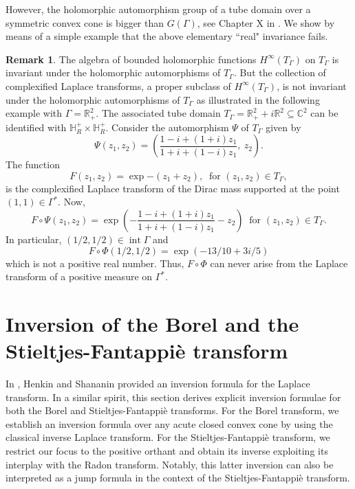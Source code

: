 \documentclass[11pt,reqno]{amsart}
\theoremstyle{plain}
\theoremstyle{definition}
\newtheorem{remark}[theorem]{Remark}
\numberwithin{equation}{section}
\begin{document}
However, the holomorphic automorphism group of a tube domain over a symmetric convex cone is bigger than $G(\Gamma)$, see Chapter X in \cite{Faraut-Koranyi}. We show by means of a simple example that the above  elementary ``real" invariance fails.

\begin{remark}
    The algebra of bounded holomorphic functions $H^\infty(T_\Gamma)$ on $T_\Gamma$ is invariant under the holomorphic automorphisms of $T_\Gamma$. But the collection of complexified Laplace transforms, a proper subclass of $H^\infty(T_\Gamma)$, is not invariant under the holomorphic automorphisms of $T_\Gamma$ as illustrated in the following example with $\Gamma = \mathbb{R}^2_+$. The associated tube domain $T_\Gamma = \mathbb{R}^2_+ + i \mathbb{R}^2 \subseteq \mathbb{C}^2$ can be identified with $\mathbb{H}_R^+ \times \mathbb{H}_R^+$. Consider the automorphism $\Psi$ of $T_\Gamma$ given by
	$$
	\Psi(z_1, z_2) = \left(\frac{1-i + (1+i)z_1}{1+i + (1-i)z_1}, \ z_2 \right).
	$$
	The function
	$$
	F(z_1, z_2) = \exp{-(z_1 + z_2)}, \ \text{ for } (z_1, z_2) \in T_\Gamma,
	$$
	is the complexified Laplace transform of the Dirac mass supported at the point $(1, 1) \in \Gamma^*$.
	Now,
	$$
	F\circ \Psi (z_1, z_2) = \exp{ \left(-\frac{1-i + (1+i)z_1}{1+i + (1-i)z_1} - z_2 \right)} \ \text{ for }(z_1, z_2) \in T_\Gamma.
	$$
	In particular, $(1/2, 1/2) \in \operatorname{int}\Gamma$ and
	$$
	F \circ \Phi(1/2, 1/2) = \exp(-13/10 +  3i/5 )
	$$
	which is not a positive real number. Thus, $F \circ \Phi$ can never arise from the Laplace transform of a positive measure on $\Gamma^*$.
\end{remark}


	\section{Inversion of the Borel and the Stieltjes-Fantappi\`e transform}\label{sec:inversion}
   In \cite[Proposition~4.1]{HS}, Henkin and Shananin provided an inversion formula for the Laplace transform. In a similar spirit, this section derives explicit inversion formulae for both the Borel and Stieltjes-Fantappi\`e transforms. For the Borel transform, we establish an inversion formula over any acute closed convex cone by using the classical inverse Laplace transform. For the Stieltjes-Fantappi\`e transform, we restrict our focus to the positive orthant and obtain its inverse exploiting its interplay with the Radon transform. Notably, this latter inversion can also be interpreted as a jump formula in the context of the Stieltjes-Fantappi\`e transform. 
\end{document}
